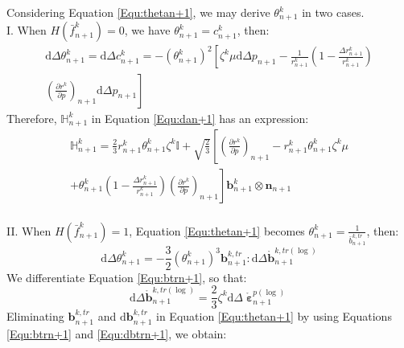Considering Equation \ref{Equ:thetan+1}, we may derive $\theta _{n + 1}^k$ in two cases.\\
I. When $H\left( {\bar f_{n + 1}^k} \right) = 0$, we have $\theta _{n + 1}^k = c_{n + 1}^k$, then:
\begin{equation}
\begin{aligned}
{\text{d}} \Delta \theta _{n + 1}^k = {\text{d}} \Delta c_{n + 1}^k =  - {\left( {\theta _{n + 1}^k} \right)^2} \left[ {\zeta ^k}\mu {\text{d}}\Delta {p_{n + 1}} - \frac{1}{{r_{n + 1}^k}}\left( {1 - \frac{{\Delta r_{n + 1}^k}}{{r_{n + 1}^k}}} \right)\right.\\
\left.{{\left( {\frac{{\partial {r^k}}}{{\partial p}}} \right)}_{n + 1}}{\text{d}}\Delta {p_{n + 1}} \right]
\end{aligned}
\end{equation}
Therefore, $\mathbb{H}_{n + 1}^k$ in Equation \ref{Equ:dan+1} has an expression:
\begin{equation}
\begin{aligned}
\mathbb{H}_{n + 1}^k = \frac{2}{3}r_{n + 1}^k\theta _{n + 1}^k{\zeta ^k}\mathbb{I} + \sqrt {\frac{2}{3}} \left[ {{\left( {\frac{{\partial {r^k}}}{{\partial p}}} \right)}_{n + 1}} - r_{n + 1}^k\theta _{n + 1}^k{\zeta ^k}\mu \right.\\
\left. + \theta _{n + 1}^k\left( {1 - \frac{{\Delta r_{n + 1}^k}}{{r_{n + 1}^k}}} \right){{\left( {\frac{{\partial {r^k}}}{{\partial p}}} \right)}_{n + 1}} \right]{\mathbf{b}}_{n + 1}^k \otimes {{\mathbf{n}}_{n + 1}}
\end{aligned}
\end{equation}\\
II. When $H\left( {\bar f_{n + 1}^k} \right) = 1$, Equation \ref{Equ:thetan+1} becomes $\theta _{n + 1}^k = \frac{1}{{\bar b_{n + 1}^{k,tr}}}$, then:
\begin{equation}
\label{Equ:thetan+1}
{\text{d}} \Delta \theta _{n + 1}^k =  - \frac{3}{2}{\left( {\theta _{n + 1}^k} \right)^3}{\mathbf{b}}_{n + 1}^{k,tr}:\text{d} \Delta \mathring {\mathbf{b}}_{n + 1}^{k,tr(\log) }
\end{equation}
We differentiate Equation \ref{Equ:btrn+1}, so that:
\begin{equation}
\label{Equ:dbtrn+1}
\text{d} \Delta \mathring {\mathbf{b}}_{n + 1}^{k,tr(\log) } = \frac{2}{3}{\zeta ^k}{\text{d}}\Delta \mathring {\bm{\upepsilon}}_{n + 1}^{p(\log) }
\end{equation}
Eliminating ${\mathbf{b}}_{n + 1}^{k,tr}$ and ${\text{d}}{\mathbf{b}}_{n + 1}^{k,tr}$ in Equation \ref{Equ:thetan+1} by using Equations \ref{Equ:btrn+1} and \ref{Equ:dbtrn+1}, we obtain:
